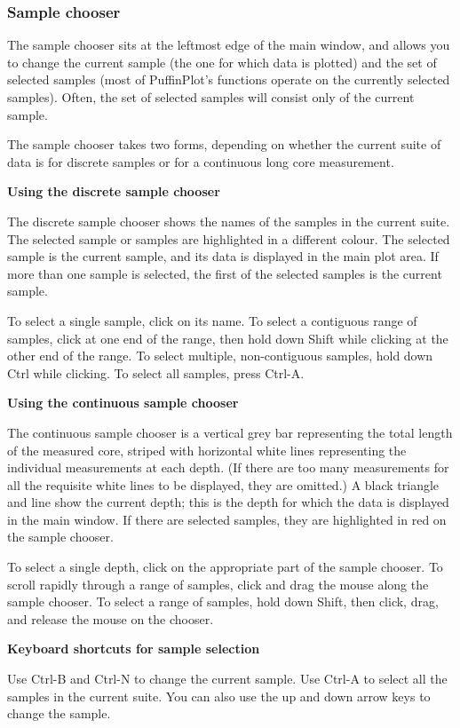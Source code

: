 \documentclass[a4paper,british]{article}
\newcommand{\ppcmd}[1]{\textsf{#1}} %
\newcommand{\mypara}[1]{\noindent\textbf{#1}

\noindent\ignorespaces} %
\begin{document}
\subsubsection{Sample chooser}

The sample chooser sits at the leftmost edge of the main window, and
allows you to change the current sample (the one for which data is
plotted) and the set of selected samples (most of PuffinPlot's functions
operate on the currently selected samples). Often, the set of selected
samples will consist only of the current sample.

The sample chooser takes two forms, depending on whether the current
suite of data is for discrete samples or for a continuous long core
measurement.

\mypara{Using the discrete sample chooser} The discrete sample chooser
shows the names of the samples in the current suite. The selected sample
or samples are highlighted in a different colour. The selected sample is
the current sample, and its data is displayed in the main plot area. If
more than one sample is selected, the first of the selected samples is
the current sample.

To select a single sample, click on its name. To select a contiguous range of
samples, click at one end of the range, then hold down \ppcmd{Shift} while
clicking at the other end of the range. To select multiple, non-contiguous
samples, hold down \ppcmd{Ctrl} while clicking. To select all samples, press
\ppcmd{Ctrl-A}.

\mypara{Using the continuous sample chooser} The continuous sample
chooser is a vertical grey bar representing the total length of the
measured core, striped with horizontal white lines representing the
individual measurements at each depth. (If there are too many
measurements for all the requisite white lines to be displayed, they are
omitted.) A black triangle and line show the current depth; this is the
depth for which the data is displayed in the main window. If there are
selected samples, they are highlighted in red on the sample chooser.

To select a single depth, click on the appropriate part of the sample
chooser. To scroll rapidly through a range of samples, click and drag the
mouse along the sample chooser. To select a range of samples, hold down
\ppcmd{Shift}, then click, drag, and release the mouse on the chooser.

\mypara{Keyboard shortcuts for sample selection} Use \ppcmd{Ctrl-B} and
\ppcmd{Ctrl-N} to change the current sample. Use \ppcmd{Ctrl-A} to
select all the samples in the current suite. You can also use the up and
down arrow keys to change the sample.
\end{document}
